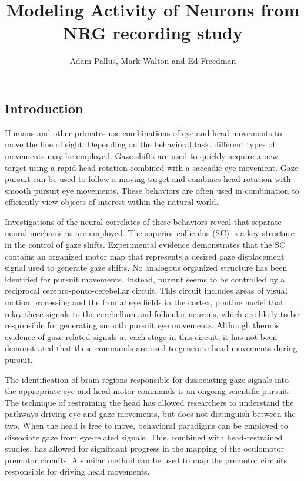 \documentclass[]{article}
\title{Modeling Activity of Neurons from NRG recording study}
\author{Adam Pallus, Mark Walton and Ed Freedman}
\date{}
\begin{document}
\maketitle


\subsection{Introduction}\label{introduction}

Humans and other primates use combinations of eye and head movements to
move the line of sight. Depending on the behavioral task, different
types of movements may be employed. Gaze shifts are used to quickly
acquire a new target using a rapid head rotation combined with a
saccadic eye movement. Gaze pursuit can be used to follow a moving
target and combines head rotation with smooth pursuit eye movements.
These behaviors are often used in combination to efficiently view
objects of interest within the natural world.

Investigations of the neural correlates of these behaviors reveal that
separate neural mechanisms are employed. The superior colliculus (SC) is
a key structure in the control of gaze shifts. Experimental evidence
demonstrates that the SC contains an organized motor map that represents
a desired gaze displacement signal used to generate gaze shifts. No
analogous organized structure has been identified for pursuit movements.
Instead, pursuit seems to be controlled by a reciprocal
cerebro-ponto-cerebellar circuit. This circuit includes areas of visual
motion processing and the frontal eye fields in the cortex, pontine
nuclei that relay these signals to the cerebellum and follicular
neurons, which are likely to be responsible for generating smooth
pursuit eye movements. Although there is evidence of gaze-related
signals at each stage in this circuit, it has not been demonstrated that
these commands are used to generate head movements during pursuit.

The identification of brain regions responsible for dissociating gaze
signals into the appropriate eye and head motor commands is an ongoing
scientific pursuit. The technique of restraining the head has allowed
researchers to understand the pathways driving eye and gaze movements,
but does not distinguish between the two. When the head is free to move,
behavioral paradigms can be employed to dissociate gaze from eye-related
signals. This, combined with head-restrained studies, has allowed for
significant progress in the mapping of the oculomotor premotor circuits.
A similar method can be used to map the premotor circuits responsible
for driving head movements.
\end{document}
